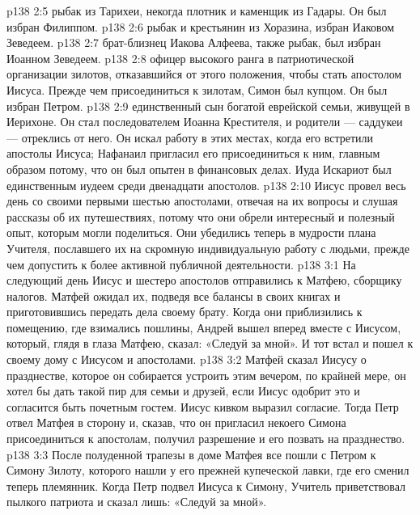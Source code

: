 \vs p138 2:5 \bibnobreakspace {} рыбак из Тарихеи, некогда плотник и каменщик из Гадары. Он был избран Филиппом.
\vs p138 2:6 \bibnobreakspace {} рыбак и крестьянин из Хоразина, избран Иаковом Зеведеем.
\vs p138 2:7 \bibnobreakspace {} брат\hyp{}близнец Иакова Алфеева, также рыбак, был избран Иоанном Зеведеем.
\vs p138 2:8 \bibnobreakspace {} офицер высокого ранга в патриотической организации зилотов, отказавшийся от этого положения, чтобы стать апостолом Иисуса. Прежде чем присоединиться к зилотам, Симон был купцом. Он был избран Петром.
\vs p138 2:9 \bibnobreakspace {} единственный сын богатой еврейской семьи, живущей в Иерихоне. Он стал последователем Иоанна Крестителя, и родители --- саддукеи --- отреклись от него. Он искал работу в этих местах, когда его встретили апостолы Иисуса; Нафанаил пригласил его присоединиться к ним, главным образом потому, что он был опытен в финансовых делах. Иуда Искариот был единственным иудеем среди двенадцати апостолов.
\vs p138 2:10 \pc Иисус провел весь день со своими первыми шестью апостолами, отвечая на их вопросы и слушая рассказы об их путешествиях, потому что они обрели интересный и полезный опыт, которым могли поделиться. Они убедились теперь в мудрости плана Учителя, пославшего их на скромную индивидуальную работу с людьми, прежде чем допустить к более активной публичной деятельности.
\vs p138 3:1 На следующий день Иисус и шестеро апостолов отправились к Матфею, сборщику налогов. Матфей ожидал их, подведя все балансы в своих книгах и приготовившись передать дела своему брату. Когда они приблизились к помещению, где взимались пошлины, Андрей вышел вперед вместе с Иисусом, который, глядя в глаза Матфею, сказал: «Следуй за мной». И тот встал и пошел к своему дому с Иисусом и апостолами.
\vs p138 3:2 Матфей сказал Иисусу о празднестве, которое он собирается устроить этим вечером, по крайней мере, он хотел бы дать такой пир для семьи и друзей, если Иисус одобрит это и согласится быть почетным гостем. Иисус кивком выразил согласие. Тогда Петр отвел Матфея в сторону и, сказав, что он пригласил некоего Симона присоединиться к апостолам, получил разрешение и его позвать на празднество.
\vs p138 3:3 \pc После полуденной трапезы в доме Матфея все пошли с Петром к Симону Зилоту, которого нашли у его прежней купеческой лавки, где его сменил теперь племянник. Когда Петр подвел Иисуса к Симону, Учитель приветствовал пылкого патриота и сказал лишь: «Следуй за мной».
